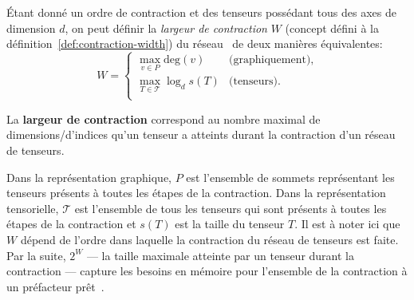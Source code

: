 Étant donné un ordre de contraction et des tenseurs possédant tous des axes de dimension $d$, on peut définir la \emph{largeur de contraction} $W$ (concept défini à la définition~\ref{def:contraction-width}) du réseau~\cite{gray_hyper-optimized_2021} de deux manières équivalentes:
\begin{equation} \label{eq:contraction-width}
    W =
    \begin{cases}
        \max_{v \in P} \mathrm{deg}(v) & \text{(graphiquement)},\\
        \max_{T \in \mathcal{T}} \log_d{s(T)} & \text{(tenseurs)}.\\
    \end{cases}
\end{equation}
\begin{definition}\label{def:contraction-width}
    La \textbf{largeur de contraction} correspond au nombre maximal de dimensions/d'indices qu'un tenseur a atteints durant la contraction d'un réseau de tenseurs.
\end{definition}
Dans la représentation graphique, $P$ est l'ensemble de sommets représentant les tenseurs présents à toutes les étapes de la contraction.
Dans la représentation tensorielle, $\mathcal{T}$ est l'ensemble de tous les tenseurs qui sont présents à toutes les étapes de la contraction et $s(T)$ est la taille du tenseur $T$.
Il est à noter ici que $W$ dépend de l'ordre dans laquelle la contraction du réseau de tenseurs est faite.
Par la suite, $2^W$ --- la taille maximale atteinte par un tenseur durant la contraction --- capture les besoins en mémoire pour l'ensemble de la contraction à un préfacteur prêt~\cite{gray_hyper-optimized_2021}.

